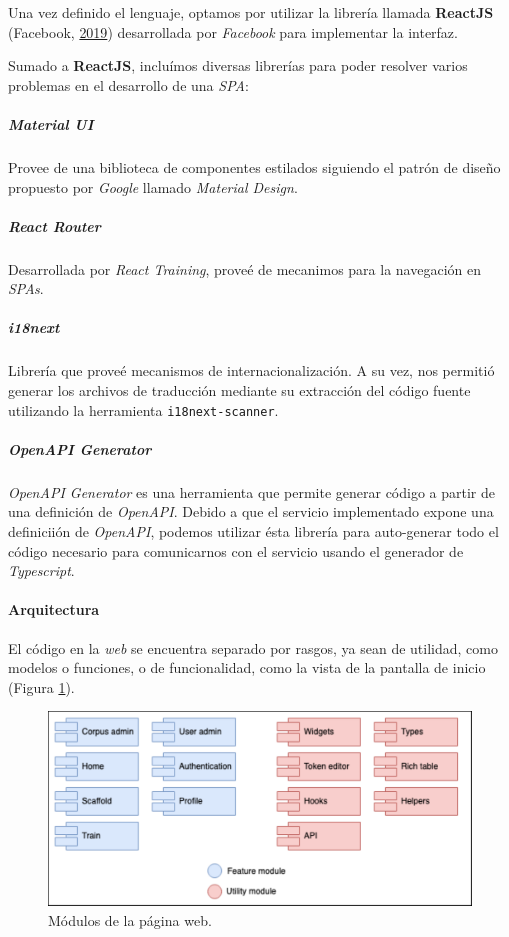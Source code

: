\documentclass[12pt,a4paper,]{scrartcl}
\let\oldparagraph\paragraph
\renewcommand{\paragraph}[1]{\oldparagraph{#1}\mbox{}}
\let\oldsubparagraph\subparagraph
\renewcommand{\subparagraph}[1]{\oldsubparagraph{#1}\mbox{}}
\begin{document}
Una vez definido el lenguaje, optamos por utilizar la librería llamada \textbf{ReactJS} (Facebook, \protect\hyperlink{ref-react}{2019}) desarrollada por \emph{Facebook} para implementar la interfaz.

Sumado a \textbf{ReactJS}, incluímos diversas librerías para poder resolver varios problemas en el desarrollo de una \emph{SPA}:

\hypertarget{material-ui}{%
\subparagraph{Material UI}\label{material-ui}}

Provee de una biblioteca de componentes estilados siguiendo el patrón de diseño propuesto por \emph{Google} llamado \emph{Material Design}.

\hypertarget{react-router}{%
\subparagraph{React Router}\label{react-router}}

Desarrollada por \emph{React Training}, proveé de mecanimos para la navegación en \emph{SPAs}.

\hypertarget{i18next}{%
\subparagraph{i18next}\label{i18next}}

Librería que proveé mecanismos de internacionalización. A su vez, nos permitió generar los archivos de traducción mediante su extracción del código fuente utilizando la herramienta \texttt{i18next-scanner}.

\hypertarget{openapi-generator}{%
\subparagraph{OpenAPI Generator}\label{openapi-generator}}

\emph{OpenAPI Generator} es una herramienta que permite generar código a partir de una definición de \emph{OpenAPI}.
Debido a que el servicio implementado expone una definiciión de \emph{OpenAPI}, podemos utilizar ésta librería para auto-generar todo el código necesario para comunicarnos con el servicio usando el generador de \emph{Typescript}.

\hypertarget{arquitectura}{%
\paragraph{Arquitectura}\label{arquitectura}}

El código en la \emph{web} se encuentra separado por rasgos, ya sean de utilidad, como modelos o funciones, o de funcionalidad, como la vista de la pantalla de inicio (Figura \ref{fig:developer-web-modules}).

\begin{figure}[H]

{\centering \includegraphics{assets/developer/web-modules.pdf} 

}

\caption{Módulos de la página web.}\label{fig:developer-web-modules}
\end{figure}
\end{document}
